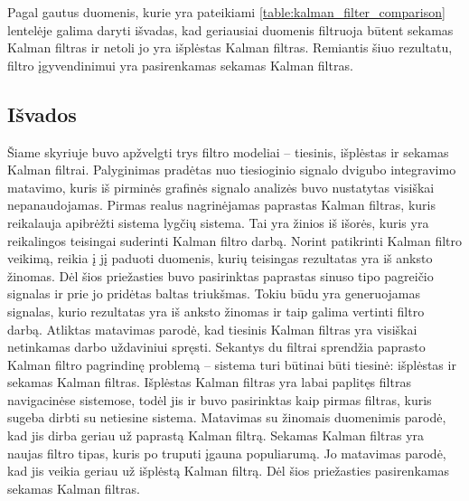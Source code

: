 Pagal gautus duomenis, kurie yra pateikiami \ref{table:kalman_filter_comparison} lentelėje galima daryti išvadas, kad geriausiai duomenis filtruoja būtent sekamas Kalman filtras ir netoli jo yra išplėstas Kalman filtras.
Remiantis šiuo rezultatu, filtro įgyvendinimui yra pasirenkamas sekamas Kalman filtras.

\subsection{Išvados}

Šiame skyriuje buvo apžvelgti trys filtro modeliai -- tiesinis, išplėstas ir sekamas Kalman filtrai.
Palyginimas pradėtas nuo tiesioginio signalo dvigubo integravimo matavimo, kuris iš pirminės grafinės signalo analizės buvo nustatytas visiškai nepanaudojamas.
Pirmas realus nagrinėjamas paprastas Kalman filtras, kuris reikalauja apibrėžti sistema lygčių sistema.
Tai yra žinios iš išorės, kuris yra reikalingos teisingai suderinti Kalman filtro darbą.
Norint patikrinti Kalman filtro veikimą, reikia į jį paduoti duomenis, kurių teisingas rezultatas yra iš anksto žinomas.
Dėl šios priežasties buvo pasirinktas paprastas sinuso tipo pagreičio signalas ir prie jo pridėtas baltas triukšmas.
Tokiu būdu yra generuojamas signalas, kurio rezultatas yra iš anksto žinomas ir taip galima vertinti filtro darbą.
Atliktas matavimas parodė, kad tiesinis Kalman filtras yra visiškai netinkamas darbo uždaviniui spręsti.
Sekantys du filtrai sprendžia paprasto Kalman filtro pagrindinę problemą -- sistema turi būtinai būti tiesinė: išplėstas ir sekamas Kalman filtras.
Išplėstas Kalman filtras yra labai paplitęs filtras navigacinėse sistemose, todėl jis ir buvo pasirinktas kaip pirmas filtras, kuris sugeba dirbti su netiesine sistema.
Matavimas su žinomais duomenimis parodė, kad jis dirba geriau už paprastą Kalman filtrą.
Sekamas Kalman filtras yra naujas filtro tipas, kuris po truputi įgauna populiarumą.
Jo matavimas parodė, kad jis veikia geriau už išplėstą Kalman filtrą.
Dėl šios priežasties pasirenkamas sekamas Kalman filtras.


